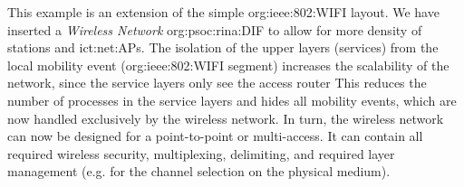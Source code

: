 This example is an extension of the simple \acs{org:ieee:802:WIFI} layout.
We have inserted a \textit{Wireless Network} \acs{org:psoc:rina:DIF} to allow for more density of stations and \acp{ict:net:AP}.
The isolation of the upper layers (services) from the local mobility event (\acs{org:ieee:802:WIFI} segment) increases the scalability of the network, since the service layers only see the access router
This reduces the number of processes in the service layers and hides all mobility events, which are now handled exclusively by the wireless network.
In turn, the wireless network can now be designed for a point-to-point or multi-access.
It can contain all required wireless security, multiplexing, delimiting, and required layer management (e.g. for the channel selection on the physical medium).
